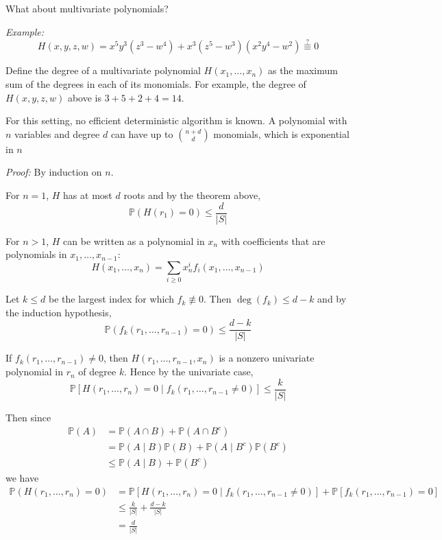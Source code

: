 \documentclass[12pt]{report}
\renewcommand{\P}{\mathbb{P}}
\newcommand{\abs}[1]{\left\vert #1 \right\vert}
\newenvironment*{tbox}[2][gray]{
    \begin{tcolorbox}[
        parbox=false,
        colback=#1!5!white,
        colframe=#1!75!black,
        breakable,
        title={#2}
    ]}
    {\end{tcolorbox}}
\begin{document}
What about multivariate polynomials? 

\emph{Example:} 
\[H(x, y, z, w) = x^5 y^3(z^3 - w^4) + x^3(z^5 - w^3)(x^2y^4 - w^2) \overset{?}{\equiv} 0\]

Define the degree of a multivariate polynomial $H(x_1, \dots, x_n)$ as the maximum sum of the degrees in each of its monomials. For example, the degree of $H(x, y, z, w)$ above is $3+5+2+4 = 14$.

For this setting, no efficient deterministic algorithm is known. A polynomial with $n$ variables and degree $d$ can have up to $\binom{n+d}{d}$ monomials, which is exponential in $n$ 

\begin{tbox}{\textbf{Theorem (Schwartz-Zippel):}  Assume that $H(x_1, \dots, x_n) \not\equiv 0$ and $\deg(H) \leq d$. Then if $r_1, \dots, r_n$ are chosen independently and uniformly at random from a set $S$ (equivalently, sampling $(r_1, \dots, r_n)$ from $S^n$), then 
    \[\P(H(r_1, \dots, r_n) = 0) \leq \frac{d}{\abs{S}} \] }
    \emph{Proof:} By induction on $n$. 

    For $n = 1$, $H$ has at most $d$ roots and by the theorem above, 
    \[\P(H(r_1) = 0) \leq \frac{d}{\abs{S}}\]

    For $n > 1$, $H$ can be written as a polynomial in $x_n$ with coefficients that are polynomials in $x_1, \dots, x_{n-1}$:
    \[H(x_1, \dots, x_n) = \sum_{i \geq 0} x_n^i f_i(x_1, \dots, x_{n-1})\]

    Let $k \leq d$ be the largest index for which $f_k \not\equiv 0$. Then $\deg(f_k) \leq d - k$ and by the induction hypothesis,
    \[\P(f_k(r_1, \dots, r_{n-1}) = 0) \leq \frac{d - k}{\abs{S}}\]

    If $f_k(r_1, \dots, r_{n-1}) \neq 0$, then $H(r_1, \dots, r_{n-1}, x_n)$ is a nonzero univariate polynomial in $r_n$ of degree $k$. Hence by the univariate case,
    \[\P[H(r_1, \dots, r_n) = 0 \; | \; f_k(r_1, \dots, r_{n-1} \neq 0)] \leq \frac{k}{\abs S}\]

    Then since 
    \begin{align*}
        \P(A) &= \P(A \cap B) + \P(A \cap B^c)\\
        &= \P(A \; | \; B) \P(B) + \P(A \; | \; B^c) \P(B^c)\\
        &\leq \P(A \; | \; B) + \P(B^c)
    \end{align*}
    we have
    \begin{align*}
        \P(H(r_1, \dots, r_n) = 0) &= \P[H(r_1, \dots, r_n) = 0 \; | \; f_k(r_1, \dots, r_{n-1} \neq 0)] + \P[f_k(r_1, \dots, r_{n-1}) = 0]\\ 
        &\leq  \frac{k}{\abs{S}} + \frac{d - k}{\abs{S}} \\ 
        &= \frac{d}{\abs{S}}
    \end{align*}
    
\end{tbox}
\end{document}
